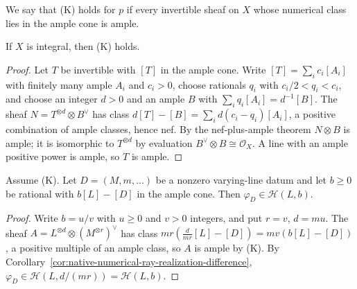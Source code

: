 \begin{definition}
\label{def:native-numerical-kleiman-criterion}
\leanok
{}
We say that (K) holds for $p$ if every invertible sheaf on $X$ whose
numerical class lies in the ample cone is ample.
\end{definition}

\begin{theorem}
\label{thm:native-numerical-kleiman-from-nef-ample}
\leanok
{}
If $X$ is integral, then (K) holds.
\end{theorem}
\begin{proof}
Let $T$ be invertible with $[T]$ in the ample cone.  Write
$[T]=\sum_ic_i[A_i]$ with finitely many ample $A_i$ and $c_i>0$, choose
rationals $q_i$ with $c_i/2<q_i<c_i$, and choose an integer $d>0$ and an ample
$B$ with $\sum_iq_i[A_i]=d^{-1}[B]$.  The sheaf $N=T^{\otimes d}\otimes B^\vee$
has class $d[T]-[B]=\sum_id(c_i-q_i)[A_i]$, a positive combination of ample
classes, hence nef.  By the nef-plus-ample theorem $N\otimes B$ is ample; it is
isomorphic to $T^{\otimes d}$ by evaluation $B^\vee\otimes B\cong\mathcal O_X$.
A line with an ample positive power is ample, so $T$ is ample.
\end{proof}

\begin{lemma}
\label{lem:native-numerical-ray-from-ample-class}
\leanok
{}
Assume (K).  Let $D=(M,m,\dots)$ be a nonzero varying-line datum and let
$b\ge0$ be rational with $b[L]-[D]$ in the ample cone.  Then
$\varphi_D\in\mathcal H(L,b)$.
\end{lemma}
\begin{proof}
Write $b=u/v$ with $u\ge0$ and $v>0$ integers, and put $r=v$, $d=mu$.  The
sheaf $A=L^{\otimes d}\otimes(M^{\otimes r})^\vee$ has class
$mr(\frac{d}{mr}[L]-[D])=mv(b[L]-[D])$, a positive multiple of an ample class,
so $A$ is ample by (K).  By
Corollary~\ref{cor:native-numerical-ray-realization-difference},
$\varphi_D\in\mathcal H(L,d/(mr))=\mathcal H(L,b)$.
\end{proof}

